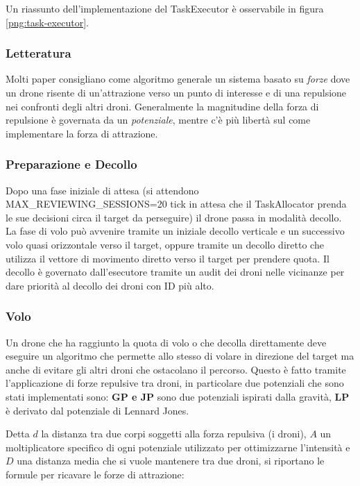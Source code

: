 \documentclass[a4paper,11pt,oneside, table]{article}
\begin{document}
Un riassunto dell'implementazione del TaskExecutor \`e osservabile in figura \ref{png:task-executor}.

\subsubsection{Letteratura}

Molti paper consigliano come algoritmo generale un sistema basato su \textit{forze} dove un drone risente di un'attrazione verso un punto di interesse e di una repulsione nei confronti degli altri droni.
Generalmente la magnitudine della forza di repulsione \`e governata da un \textit{potenziale}, mentre c'\`e pi\`u libert\`a sul come implementare la forza di attrazione.

\subsubsection{Preparazione e Decollo}

Dopo una fase iniziale di attesa (si attendono MAX\_REVIEWING\_SESSIONS=20 tick in attesa che il TaskAllocator prenda le sue decisioni circa il target da perseguire) il drone passa in modalit\`a decollo. La fase di volo pu\`o avvenire tramite un iniziale decollo verticale e un successivo volo quasi orizzontale verso il target, oppure tramite un decollo diretto che utilizza il vettore di movimento diretto verso il target per prendere quota.
Il decollo \`e governato dall'esecutore tramite un audit dei droni nelle vicinanze per dare priorit\`a al decollo dei droni con ID pi\`u alto.

\subsubsection{Volo}

Un drone che ha raggiunto la quota di volo o che decolla direttamente deve eseguire un algoritmo che permette allo stesso di volare in direzione del target ma anche di evitare gli altri droni che ostacolano il percorso.
Questo \`e fatto tramite l'applicazione di forze repulsive tra droni, in particolare due potenziali che sono stati implementati sono: \textbf{GP e JP} sono due potenziali ispirati dalla gravit\`a, \textbf{LP} \`e derivato dal potenziale di Lennard Jones.

Detta $d$ la distanza tra due corpi soggetti alla forza repulsiva (i droni), $A$ un moltiplicatore specifico di ogni potenziale utilizzato per ottimizzarne l'intensit\`a e $D$ una distanza media che si vuole mantenere tra due droni, si riportano le formule per ricavare le forze di attrazione:
\end{document}
